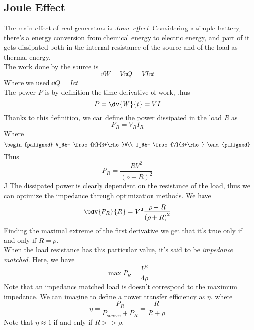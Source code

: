 \documentclass[../electromagnetism.tex]{subfiles}
\begin{document}
\subsection{Joule Effect}
The main effect of real generators is \textit{Joule effect}. Considering a simple battery, there's a energy conversion from chemical energy to electric energy, and part of it gets dissipated both in the internal resistance of the source and of the load as thermal energy.\\
The work done by the source is
\begin{equation*}
	\dd W=V\dd Q=VI\dd t
\end{equation*}
Where we used $\dd Q=I\dd t$\\
The power $P$ is by definition the time derivative of work, thus
\begin{equation}
	P=\dv{W}{t}=VI
	\label{eq:power.dc}
\end{equation}
Thanks to this definition, we can define the power dissipated in the load $R$ as
\begin{equation*}
	P_R=V_RI_R
\end{equation*}
Where
\begin{equation*}
	\begin{paligned}
		V_R&= \frac{R}{R+\rho}V\\
		I_R&= \frac{V}{R+\rho}
	\end{paligned}
\end{equation*}
Thus
\begin{equation*}
	P_R=\frac{RV^2}{\left( \rho+R \right)^2}
\end{equation*}J
The dissipated power is clearly dependent on the resistance of the load, thus we can optimize the impedance through optimization methods. We have
\begin{equation*}
	\pdv{P_R}{R}=V^2\frac{\rho-R}{\left( \rho+R \right)^2}
\end{equation*}
Finding the maximal extreme of the first derivative we get that it's true only if and only if $R=\rho$.\\
When the load resistance has this particular value, it's said to be \textit{impedance matched}. Here, we have
\begin{equation*}
	\max{P_R}=\frac{V^2}{4\rho}
\end{equation*}
Note that an impedance matched load is doesn't correspond to the maximum impedance. We can imagine to define a power transfer efficiency as $\eta$, where
\begin{equation}
	\eta=\frac{P_R}{P_{source}+P_R}=\frac{R}{R+\rho}
	\label{eq:geneff.dc}
\end{equation}
Note that $\eta\approx1$ if and only if $R>>\rho$.
\end{document}
